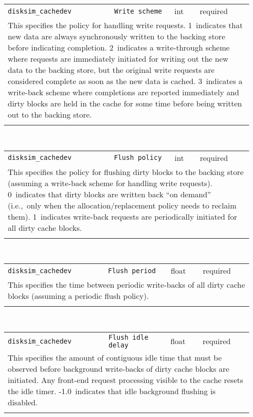 \noindent 
\begin{tabular}{|p{\lpmodwidth}|p{\lpnamewidth}|p{0.5in}|p{0.5in}|}
\cline{1-4}
\texttt{disksim\_cachedev} & \texttt{Write scheme} & int & required \\ 
\cline{1-4}
\multicolumn{4}{|p{6in}|}{
This specifies the policy for handling write requests.
1~indicates that new data are always synchronously written to the
backing store before indicating completion.
2~indicates a write-through scheme where requests are immediately
initiated for writing out the new data to the backing store, but the
original write requests are considered complete as soon as the new
data is cached.
3~indicates a write-back scheme where completions are reported
immediately and dirty blocks are held in the cache for some time
before being written out to the backing store.
}\\ 
\cline{1-4}
\multicolumn{4}{p{5in}}{}\\
\end{tabular}\\ 
\noindent 
\begin{tabular}{|p{\lpmodwidth}|p{\lpnamewidth}|p{0.5in}|p{0.5in}|}
\cline{1-4}
\texttt{disksim\_cachedev} & \texttt{Flush policy} & int & required \\ 
\cline{1-4}
\multicolumn{4}{|p{6in}|}{
This specifies the policy for flushing dirty blocks to the backing store
(assuming a write-back scheme for handling write requests).
0~indicates that dirty blocks are written back ``on demand''
(i.e.,~only when the allocation/replacement policy needs to reclaim
them).
1~indicates write-back requests are periodically initiated for all
dirty cache blocks.
}\\ 
\cline{1-4}
\multicolumn{4}{p{5in}}{}\\
\end{tabular}\\ 
\noindent 
\begin{tabular}{|p{\lpmodwidth}|p{\lpnamewidth}|p{0.5in}|p{0.5in}|}
\cline{1-4}
\texttt{disksim\_cachedev} & \texttt{Flush period} & float & required \\ 
\cline{1-4}
\multicolumn{4}{|p{6in}|}{
This specifies the time between periodic write-backs of all dirty cache
blocks (assuming a periodic flush policy).
}\\ 
\cline{1-4}
\multicolumn{4}{p{5in}}{}\\
\end{tabular}\\ 
\noindent 
\begin{tabular}{|p{\lpmodwidth}|p{\lpnamewidth}|p{0.5in}|p{0.5in}|}
\cline{1-4}
\texttt{disksim\_cachedev} & \texttt{Flush idle delay} & float & required \\ 
\cline{1-4}
\multicolumn{4}{|p{6in}|}{
This specifies the amount of contiguous idle time that must be observed
before background write-backs of dirty cache blocks are initiated.
Any front-end request processing visible to the cache resets the idle
timer. -1.0~indicates that idle background flushing is disabled.
}\\ 
\cline{1-4}
\multicolumn{4}{p{5in}}{}\\
\end{tabular}\\ 

